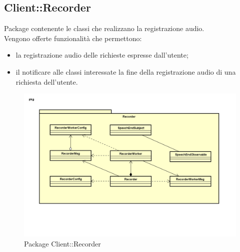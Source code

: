 \subsection{Client::Recorder}
Package contenente le classi che realizzano la registrazione audio.\\ Vengono offerte funzionalità che permettono: \begin{itemize} \item la registrazione audio delle richieste espresse dall'utente; \item il notificare alle classi interessate la fine della registrazione audio di una richiesta dell'utente. \end{itemize}
\begin{figure}[h] \centering \includegraphics[width=\textwidth,height=\textheight,keepaspectratio]{images/diagrams/client/Client/Recorder.png}
\caption{Package Client::Recorder}
\end{figure}
\newpage



